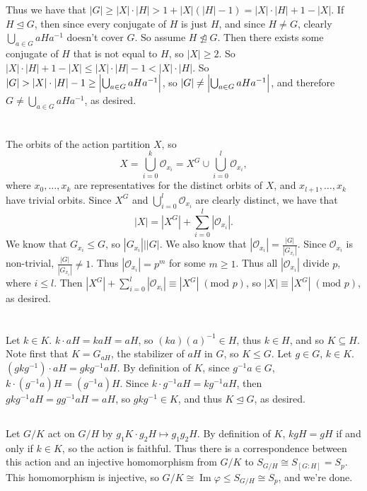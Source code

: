 \documentclass[11pt]{article}
\DeclareMathOperator{\im}{Im}
\begin{document}
Thus we have that $|G|\ge|X|\cdot|H|>1+|X|(|H|-1)=|X|\cdot|H|+1-|X|$. If
$H\trianglelefteq G$, then since every conjugate of $H$ is just $H$, and since
$H\neq G$, clearly $\bigcup_{a\in G}aHa^{-1}$ doesn't cover $G$. So assume
$H\not\trianglelefteq G$. Then there exists some conjugate of $H$ that is not
equal to $H$, so $|X|\ge2$. So $|X|\cdot|H|+1-|X|\le|X|\cdot|H|-1<|X|\cdot|H|$.
So $|G|>|X|\cdot|H|-1\ge\Bigl|\bigcup_{a\in G}aHa^{-1}\Bigr|$, so
$|G|\neq\Bigl|\bigcup_{a\in G}aHa^{-1}\Bigr|$, and therefore
$G\neq\bigcup_{a\in G}aHa^{-1}$, as desired.


\section{} %
The orbits of the action partition $X$, so
\[X=\bigcup_{i=0}^k\mathcal O_{x_i}=X^G\cup\bigcup_{i=0}^l\mathcal O_{x_i},\]
where $x_0,\ldots,x_k$ are representatives for the distinct orbits of $X$, and
$x_{l+1},\ldots,x_k$ have trivial orbits. Since $X^G$ and
$\bigcup_{i=0}^l\mathcal O_{x_i}$ are clearly distinct, we have that
\[|X|=|X^G|+\sum_{i=0}^l|\mathcal O_{x_i}|.\]
We know that $G_{x_i}\le G$, so $|G_{x_i}|\big\vert|G|$. We also know that
$|\mathcal O_{x_i}|=\frac{|G|}{|G_{x_i}|}$. Since $\mathcal O_{x_i}$ is
non-trivial, $\frac{|G|}{|G_{x_i}|}\neq1$. Thus $|\mathcal O_{x_i}|=p^m$ for
some $m\ge1$. Thus all $|\mathcal O_{x_i}|$ divide $p$, where $i\le l$. Then
$|X^G|+\sum_{i=0}^l|\mathcal O_{x_i}|\equiv|X^G|\;(\text{mod }p)$, so
$|X|\equiv|X^G|\;(\text{mod }p)$, as desired.


\section{} %
\subsection{} %
Let $k\in K$. $k\cdot aH=kaH=aH$, so $(ka)(a)^{-1}\in H$, thus $k\in H$, and
so $K\subseteq H$.
\newline
\newline
Note first that $K=G_{aH}$, the stabilizer of $aH$ in $G$, so $K\le G$. Let
$g\in G$, $k\in K$. $(gkg^{-1})\cdot aH=gkg^{-1}aH$. By definition of $K$,
since $g^{-1}a\in G$, $k\cdot (g^{-1}a)H=(g^{-1}a)H$. Since
$k\cdot g^{-1}aH=kg^{-1}aH$, then $gkg^{-1}aH=gg^{-1}aH=aH$, so
$gkg^{-1}\in K$, and thus $K\trianglelefteq G$, as desired.


\subsection{} %
Let $G/K$ act on $G/H$ by $g_1K\cdot g_2H\longmapsto g_1g_2H$. By definition
of $K$, $kgH=gH$ if and only if $k\in K$, so the action is faithful. Thus there
is a correspondence between this action and an injective homomorphism from
$G/K$ to $S_{G/H}\cong S_{[G:H]}=S_p$. This homomorphism is injective, so
$G/K\cong\im\varphi\le S_{G/H}\cong S_p$, and we're done.
\end{document}

